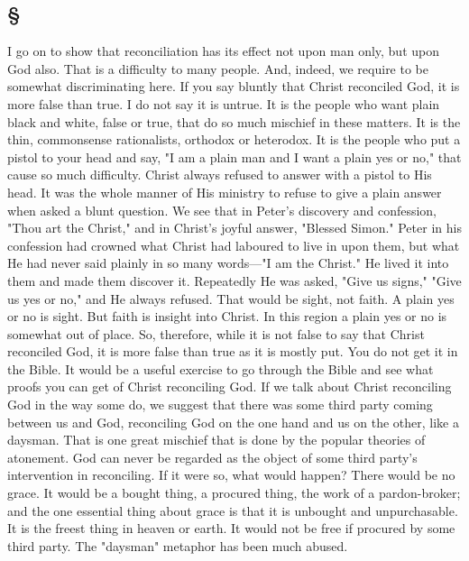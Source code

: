 \documentclass[draft]{ptfdoc}
\begin{document}
\subsection*{
\S
}

I go on to show that reconciliation has its 
effect not upon man only, but upon God also. 
That is a difficulty to many people. And, indeed, 
we require to be somewhat discriminating here. 
If you say bluntly that Christ reconciled God, 
it is more false than true. I do not say it 
is untrue. It is the people who want plain 
black and white, false or true, that do so much 
mischief in these matters. It is the thin, 
commonsense rationalists, orthodox or heterodox. 
It is the people who put a pistol to your 
head and say, "I am a plain man and I 
want a plain yes or no," that cause so 
much difficulty. Christ always refused to 
answer with a pistol to His head. It was the 
whole manner of His ministry to refuse to give 
a plain answer when asked a blunt question. 
We see that in Peter's discovery and confession, 
"Thou art the Christ," and in Christ's joyful 
answer, "Blessed Simon." Peter in his confession 
had crowned what Christ had laboured 
to live in upon them, but what He had never 
said plainly in so many words---"I am the 
Christ." He lived it into them and made them 
discover it. Repeatedly He was asked, "Give us 
signs," "Give us yes or no," and He always 
refused. That would be sight, not faith. A 
plain yes or no is sight. But faith is insight 
into Christ. In this region a plain yes or no 
is somewhat out of place. So, therefore, while 
it is not false to say that Christ reconciled 
God, it is more false than true as it is mostly 
put. You do not get it in the Bible. It would 
be a useful exercise to go through the Bible 
and see what proofs you can get of Christ 
reconciling God. If we talk about Christ reconciling 
God in the way some do, we suggest that 
there was some third party coming between us 
and God, reconciling God on the one hand and 
us on the other, like a daysman. That is one 
great mischief that is done by the popular 
theories of atonement. God can never be 
regarded as the object of some third party's 
intervention in reconciling. If it were so, what 
would happen? There would be no grace. It 
would be a bought thing, a procured thing, 
the work of a pardon-broker; and the one 
essential thing about grace is that it is unbought 
and unpurchasable. It is the freest 
thing in heaven or earth. It would not be 
free if procured by some third party. The 
"daysman" metaphor has been much abused. 
\end{document}
